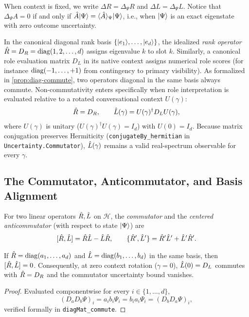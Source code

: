 When context is fixed, we write $\Delta R = \Delta_{\Psi} R$ and $\Delta L = \Delta_{\Psi} L$.
Notice that $\Delta_{\Psi} A = 0$ if and only if $\hat{A}\lvert \Psi \rangle = \langle \hat{A} \rangle_{\Psi}\lvert \Psi \rangle$,
i.e., when $\lvert \Psi \rangle$ is an exact eigenstate with zero outcome uncertainty.

\noindent\layerformal{} In the canonical diagonal rank basis $\{\lvert e_1 \rangle, \dots, \lvert e_d \rangle\}$,
the idealized \emph{rank operator} $\hat{R} = D_R = \operatorname{diag}(1, 2, \dots, d)$ assigns eigenvalue $k$
to slot $k$. Similarly, a canonical role evaluation matrix $D_L$ in its native context
assigns numerical role scores (for instance $\operatorname{diag}(-1, \dots, +1)$ from contingency to
primary visibility). As formalized in \cref{prop:diag-commute}, two operators diagonal in
the same basis always commute. Non-commutativity enters specifically when role interpretation
is evaluated relative to a rotated conversational context $U(\gamma)$:
\begin{equation}
  \hat{R} = D_R, \qquad
  \hat{L}(\gamma) = U(\gamma)^\dagger D_L U(\gamma),
  \label{eq:rotated-role}
\end{equation}
where $U(\gamma)$ is unitary ($U(\gamma)^\dagger U(\gamma) = I_d$) with $U(0) = I_d$.
Because matrix conjugation preserves Hermiticity (\texttt{conjugateBy\_\allowbreak{}hermitian} in
\texttt{Uncertainty.Commutator}), $\hat{L}(\gamma)$ remains a valid real-spectrum observable
for every $\gamma$.

\subsection{The Commutator, Anticommutator, and Basis Alignment}
\label{subsec:unc-commutator}

\begin{definition}
\label{def:commutator}
For two linear operators $\hat{R}, \hat{L}$ on $\mathcal{H}$, the \emph{commutator} and the
\emph{centered anticommutator} (with respect to state $\lvert \Psi \rangle$) are
\begin{equation}
  [\hat{R}, \hat{L}] = \hat{R}\hat{L} - \hat{L}\hat{R},
  \qquad
  \{\hat{R}', \hat{L}'\} = \hat{R}'\hat{L}' + \hat{L}'\hat{R}'.
  \label{eq:commutator}
\end{equation}
\end{definition}

\begin{proposition}
\label{prop:diag-commute}
If $\hat{R} = \operatorname{diag}(a_1, \dots, a_d)$ and $\hat{L} = \operatorname{diag}(b_1, \dots, b_d)$ in the same basis,
then $[\hat{R}, \hat{L}] = 0$. Consequently, at zero context rotation ($\gamma = 0$),
$\hat{L}(0) = D_L$ commutes with $\hat{R} = D_R$ and the commutator uncertainty bound vanishes.
\end{proposition}
\begin{proof}
Evaluated componentwise for every $i \in \{1, \dots, d\}$,
\begin{equation*}
  (D_a D_b \Psi)_i = a_i b_i \Psi_i = b_i a_i \Psi_i = (D_b D_a \Psi)_i,
\end{equation*}
verified formally in \texttt{diagMat\_commute}.
\end{proof}


